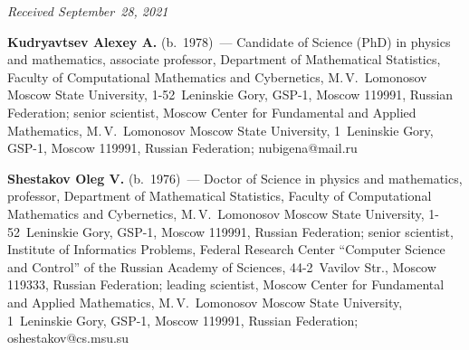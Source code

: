 \vspace*{-3pt}

  \hfill{\small\textit{Received September~28, 2021}}




\Contr

\noindent
\textbf{Kudryavtsev Alexey A.} (b.\ 1978)~--- 
Candidate of Science (PhD) in physics and mathematics, associate professor, 
Department of Mathematical Statistics, Faculty of Computational Mathematics and Cybernetics,
 M.\,V.~Lomonosov Moscow State University, 1-52~Leninskie Gory, GSP-1, Moscow 119991, 
 Russian Federation; senior scientist, Moscow Center for Fundamental and Applied Mathematics, 
 M.\,V.~Lomonosov Moscow State University, 1~Leninskie Gory, GSP-1, 
 Moscow 119991, Russian Federation; \mbox{nubigena@mail.ru}
 
 
 
 \vspace*{6pt}

\noindent
\textbf{Shestakov Oleg V.} (b.\ 1976)~--- 
Doctor of Science in physics and mathematics, professor, Department of Mathematical Statistics, 
Faculty of Computational Mathematics and Cybernetics, M.\,V.~Lomonosov Moscow State University, 
1-52~Leninskie Gory, GSP-1, Moscow 119991, Russian Federation; senior scientist, 
Institute of Informatics Problems, Federal Research Center ``Computer Science and Control'' 
of the Russian Academy of Sciences, 44-2~Vavilov Str., Moscow 119333, Russian Federation; 
leading scientist, Moscow Center for Fundamental and Applied Mathematics,
 M.\,V.~Lomonosov Moscow State University, 1~Leninskie Gory, GSP-1, Moscow 119991, Russian Federation; 
 \mbox{oshestakov@cs.msu.su}

\label{end\stat}

\renewcommand{\bibname}{\protect\rm Литература}